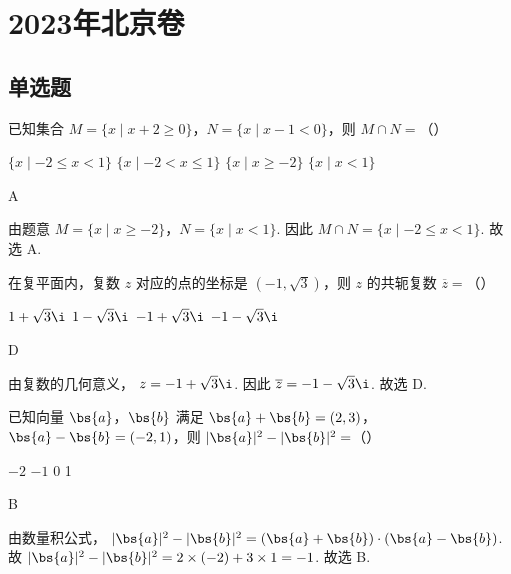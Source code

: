\chapter{2023年北京卷}

\section{单选题}

\begin{problem}
已知集合 \(M=\{x\mid x+2\ge 0\}\)，\(N=\{x\mid x-1<0\}\)，则 \(M\cap N=\)（\quad）

\choices
    {\(\{x\mid -2\le x<1\}\)}
    {\(\{x\mid -2<x\le 1\}\)}
    {\(\{x\mid x\ge -2\}\)}
    {\(\{x\mid x<1\}\)}
\end{problem}

\begin{answer}
A
\end{answer}

\begin{solution}
由题意
\(M=\{x\mid x\ge -2\}\)，\(N=\{x\mid x<1\}\).
因此
\(M\cap N=\{x\mid -2\le x<1\}\).
故选 A.
\end{solution}

\begin{problem}
在复平面内，复数 \(z\) 对应的点的坐标是 \((-1,\sqrt{3})\)，则 \(z\) 的共轭复数 \(\overline{z}=\)（\quad）

\choices
    {\(1+\sqrt{3}\i\)}
    {\(1-\sqrt{3}\i\)}
    {\(-1+\sqrt{3}\i\)}
    {\(-1-\sqrt{3}\i\)}
\end{problem}

\begin{answer}
D
\end{answer}

\begin{solution}
由复数的几何意义，
\(z=-1+\sqrt{3}\i\).
因此
\(\overline{z}=-1-\sqrt{3}\i\).
故选 D.
\end{solution}

\begin{problem}
已知向量 \(\bs{a}\)，\(\bs{b}\) 满足 \(\bs{a}+\bs{b}=(2,3)\)，\(\bs{a}-\bs{b}=(-2,1)\)，则 \(|\bs{a}|^2-|\bs{b}|^2=\)（\quad）

\choices
    {\(-2\)}
    {\(-1\)}
    {0}
    {1}
\end{problem}

\begin{answer}
B
\end{answer}

\begin{solution}
由数量积公式，
\(|\bs{a}|^2-|\bs{b}|^2=(\bs{a}+\bs{b})\cdot(\bs{a}-\bs{b})\).
故
\(|\bs{a}|^2-|\bs{b}|^2=2\times(-2)+3\times 1=-1\).
故选 B.
\end{solution}

